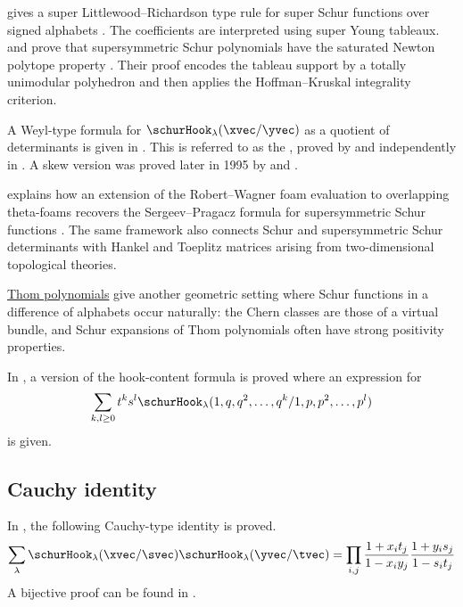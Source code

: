  gives a super Littlewood--Richardson type rule for super
Schur functions over signed alphabets \cite{Hage2025}.  The coefficients are
interpreted using super Young tableaux.
 and  prove that
supersymmetric Schur polynomials have the saturated Newton polytope property
\cite{HiepNguyenDang2025x}.  Their proof encodes the tableau support by a
totally unimodular polyhedron and then applies the Hoffman--Kruskal
integrality criterion.

A Weyl-type formula for $\schurHook_{\lambda}(\xvec/\yvec)$ as a quotient
of determinants is given in \cite[Eq.~(1.17)]{MoensJeugt2003}.
This is referred to as the 
\label{sergeevPragaczFormula},
proved by  and independently in \cite{JeugtHughesKingThierry1990}.
A skew version was proved later in 1995 by  and .

 explains how an extension of the
Robert--Wagner foam evaluation to overlapping theta-foams recovers the
Sergeev--Pragacz formula for supersymmetric Schur functions
\cite{Khovanov2020x}.  The same framework also connects Schur and
supersymmetric Schur determinants with Hankel and Toeplitz matrices arising
from two-dimensional topological theories.

\hyperref[thomPolynomials]{Thom polynomials} give another geometric setting
where Schur functions in a difference of alphabets occur naturally: the Chern
classes are those of a virtual bundle, and Schur expansions of Thom
polynomials often have strong positivity properties.


In \cite[Thm.~4.4]{Remmel1987}, a version of the
hook-content formula is proved where an expression for
\[
\sum_{k,l\geq 0}
t^k s^l \schurHook_\lambda(1,q,q^2,\dotsc,q^k / 1,p,p^2,\dotsc,p^l)
\]
is given.




\subsection[schurHookCauchy]{Cauchy identity}

In \cite{BereleRemmel1985}, the following Cauchy-type identity is proved.
\[
\sum_{\lambda}
\schurHook_\lambda(\xvec / \svec)
\schurHook_\lambda(\yvec / \tvec) =
\prod_{i,j} \frac{1+x_i t_j}{1-x_iy_j} \frac{1+y_i s_j}{1-s_i t_j}
\]
A bijective proof can be found in \cite{YangRemmel1998}.



